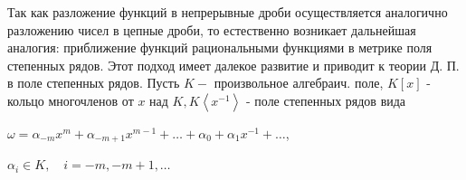 \documentclass[10pt]{article}
\begin{document}
Так как разложение функций в непрерывные дроби осуществляется аналогично разложению чисел в цепные дроби, то естественно возникает дальнейшая аналогия: приближение функций рациональными функциями в метрике поля степенных рядов. Этот подход имеет далекое развитие и приводит к теории Д. П. в поле степенных рядов. Пусть $K-$ произвольное алгебраич. поле, $K[x]$ - кольцо многочленов от $x$ над $K, K\left\langle x^{-1}\right\rangle$ - поле степенных рядов вида



$\omega=\alpha_{-m} x^{m}+\alpha_{-m+1} x^{m-1}+\ldots+\alpha_{0}+\alpha_{1} x^{-1}+\ldots$,



$\alpha_{i} \in K, \quad i=-m,-m+1, \ldots$
\end{document}
